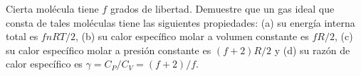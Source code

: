 \item Cierta molécula tiene $f$ grados de libertad. Demuestre que un gas ideal que consta de tales moléculas tiene las siguientes propiedades: (a) su energía interna total es $fnRT/2$, (b) su calor específico molar a volumen constante es $fR/2$, (c) su calor específico molar a presión constante es $(f + 2)R/2$ y (d) su razón de calor específico es $\gamma = C_P/C_V = (f + 2)/f$.
